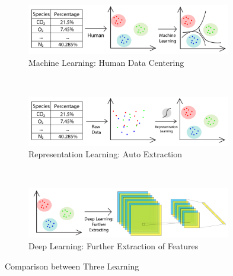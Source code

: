 \begin{spacing}{1.5}
\begin{figure}[th]
    \centering
    \begin{subfigure}[b]{0.99\textwidth}
        \centering
        \includegraphics[width=0.98\textwidth, fbox]{Chapter2/Machine-Learing.pdf}
        \caption{Machine Learning: Human Data Centering}
        \label{fig:mldiagram} 
    \end{subfigure}%
    \\
    \begin{subfigure}[b]{0.99\textwidth}
        \centering
        \includegraphics[width=0.98\textwidth, fbox]{Chapter2/Represent-Learing.pdf}
        \caption{Representation Learning: Auto Extraction}
        \label{fig:representdiagram} 
    \end{subfigure}
    \\
    \begin{subfigure}[b]{0.99\textwidth}
        \centering
        \includegraphics[width=0.98\textwidth, fbox]{Chapter2/Deep-Learing.pdf}
        \caption{Deep Learning: Further Extraction of Features}
        \label{fig:dldiagram} 
    \end{subfigure}%
    \caption{Comparison between Three Learning}
\end{figure}


\end{spacing}

